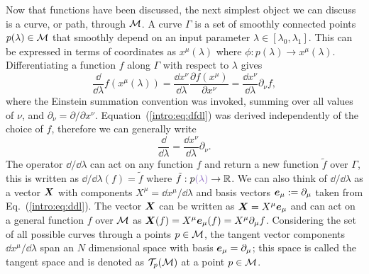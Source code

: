 Now that functions have been discussed, the next simplest object we can discuss is a curve, or path, through $\mathcal{M}$. A curve $\Gamma$ is a set of smoothly connected points $p(\lambda)\in \mathcal{M}$ that smoothly depend on an input parameter $\lambda \in [\lambda_0,\lambda_1]$. This can be expressed in terms of coordinates as $x^\mu(\lambda)$ where $\phi:p(\lambda) \rightarrow x^\mu(\lambda)$. Differentiating a function $f$ along $\Gamma$ with respect to $\lambda$ gives
\begin{equation} \label{intro:eq:dfdl}
\frac{\dd}{\dd \lambda}f(x^\mu(\lambda)) = \frac{\dd x^\nu}{\dd \lambda}\frac{\partial f(x^\mu)}{\partial x^\nu} = \frac{\dd x^\nu}{\dd \lambda}\partial_\nu f,
\end{equation}
where the Einstein summation convention was invoked, summing over all values of $\nu$, and $\partial_\nu = {\partial}/{\partial x^\nu}$. Equation~(\ref{intro:eq:dfdl}) was derived independently of the choice of $f$, therefore we can generally write
\begin{equation} \label{intro:eq:ddl}
\frac{\dd}{\dd \lambda} = \frac{\dd x^\nu}{\dd \lambda}\partial_\nu.
\end{equation}
The operator $\dd/\dd \lambda $ can act on any function $f$ and return a new function $\tilde{f}$ over {\color{orchid}$\Gamma$}, this is written as $\dd/\dd \lambda (f) = \tilde{f}$ where $\tilde{f}:p{\color{orchid}(\lambda)}\rightarrow \rspace$. We can also think of $\dd/\dd \lambda$ as a vector $\boldsymbol{X}$ with components $X^\mu=\dd x^\mu / \dd \lambda$ and basis vectors $\boldsymbol{e}_\mu:=\partial_\mu$ taken from Eq.~(\ref{intro:eq:ddl}). The vector $\boldsymbol{X}$ can be written as $\boldsymbol{X} = X^\mu \boldsymbol{e}_\mu$ and can act on a general function $f$ over $\mathcal{M}$ as $\boldsymbol{X}(f) = X^\mu \boldsymbol{e}_\mu(f) = X^\mu \partial_\mu f$. Considering the set of all possible curves through a points $p\in\mathcal{M}$, the tangent vector components $\dd x^\mu / \dd \lambda$ span an $N$ dimensional space with basis $\boldsymbol{e}_\mu = \partial_\mu$; this space is called the tangent space and is denoted as $\mathcal{T}_p(\mathcal{M})$ at a point $p\in\mathcal{M}$. 

